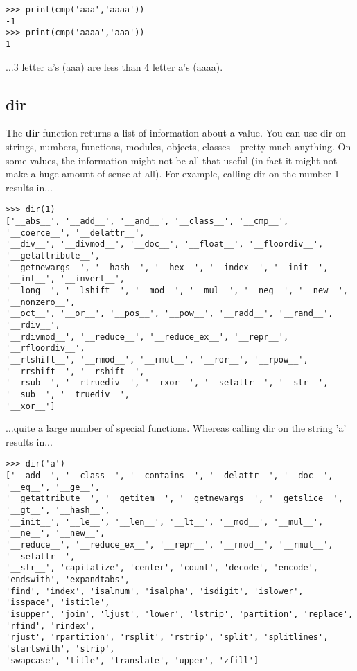 \begin{listing}
\begin{verbatim}
>>> print(cmp('aaa','aaaa'))
-1
>>> print(cmp('aaaa','aaa'))
1
\end{verbatim}
\end{listing}

\noindent
$\ldots$3 letter a's (aaa) are less than 4 letter a's (aaaa).

\subsection*{dir}

The \textbf{dir} function returns a list of information about a value.  You can use dir on strings, numbers, functions, modules, objects, classes---pretty much anything.  On some values, the information might not be all that useful (in fact it might not make a huge amount of sense at all).  For example, calling dir on the number 1 results in$\ldots$

\begin{listingignore}
\begin{verbatim}
>>> dir(1)
['__abs__', '__add__', '__and__', '__class__', '__cmp__', '__coerce__', '__delattr__', 
'__div__', '__divmod__', '__doc__', '__float__', '__floordiv__', '__getattribute__', 
'__getnewargs__', '__hash__', '__hex__', '__index__', '__init__', '__int__', '__invert__', 
'__long__', '__lshift__', '__mod__', '__mul__', '__neg__', '__new__', '__nonzero__', 
'__oct__', '__or__', '__pos__', '__pow__', '__radd__', '__rand__', '__rdiv__', 
'__rdivmod__', '__reduce__', '__reduce_ex__', '__repr__', '__rfloordiv__', 
'__rlshift__', '__rmod__', '__rmul__', '__ror__', '__rpow__', '__rrshift__', '__rshift__',
'__rsub__', '__rtruediv__', '__rxor__', '__setattr__', '__str__', '__sub__', '__truediv__',
'__xor__']
\end{verbatim}
\end{listingignore}

$\ldots$quite a large number of special functions. Whereas calling dir on the string 'a' results in...

\begin{listingignore}
\begin{verbatim}
>>> dir('a')
['__add__', '__class__', '__contains__', '__delattr__', '__doc__', '__eq__', '__ge__', 
'__getattribute__', '__getitem__', '__getnewargs__', '__getslice__', '__gt__', '__hash__',
'__init__', '__le__', '__len__', '__lt__', '__mod__', '__mul__', '__ne__', '__new__', 
'__reduce__', '__reduce_ex__', '__repr__', '__rmod__', '__rmul__', '__setattr__', 
'__str__', 'capitalize', 'center', 'count', 'decode', 'encode', 'endswith', 'expandtabs', 
'find', 'index', 'isalnum', 'isalpha', 'isdigit', 'islower', 'isspace', 'istitle', 
'isupper', 'join', 'ljust', 'lower', 'lstrip', 'partition', 'replace', 'rfind', 'rindex', 
'rjust', 'rpartition', 'rsplit', 'rstrip', 'split', 'splitlines', 'startswith', 'strip', 
'swapcase', 'title', 'translate', 'upper', 'zfill']
\end{verbatim}
\end{listingignore}

